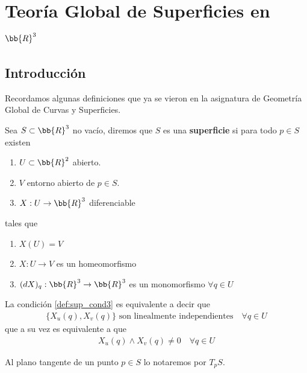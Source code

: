 \chapter{Teoría Global de Superficies en $\bb{R}^3$}

\section{Introducción}

Recordamos algunas definiciones que ya se vieron en la asignatura de Geometría Global de Curvas y Superficies.

\begin{definicion}
    Sea $S\subset \bb{R}^3$ no vacío, diremos que $S$ es una \textbf{superficie} si para todo $p\in S$ existen
    \begin{enumerate}[label=\alph*)]
        \item \label{def:sup_exists1} $U\subset \bb{R}^2$ abierto.
        \item \label{def:sup_exists2} $V$ entorno abierto de $p\in S$.
        \item \label{def:sup_exists3} $X: U \to \bb{R}^3$ diferenciable
    \end{enumerate}
    tales que
    \begin{enumerate}[label=\arabic*)]
        \item \label{def:sup_cond1} $X(U)=V$
        \item \label{def:sup_cond2} $X: U \to V$ es un homeomorfismo
        \item \label{def:sup_cond3} $(dX)_q: \bb{R}^3\to \bb{R}^3$ es un monomorfismo $\forall q\in U$
    \end{enumerate}
\end{definicion}

\begin{observacion}
    La condición \ref{def:sup_cond3} es equivalente a decir que 
    \begin{gather*}
        \{X_u(q), X_v(q)\} \text{ son linealmente independientes} \quad \forall q\in U
    \end{gather*}
    que a su vez es equivalente a que
    \begin{gather*}
        X_u(q) \wedge X_v(q) \neq 0 \quad \forall q \in U
    \end{gather*}
\end{observacion}

\begin{notacion}
    Al plano tangente de un punto $p\in S$ lo notaremos por $T_pS$.
\end{notacion}

